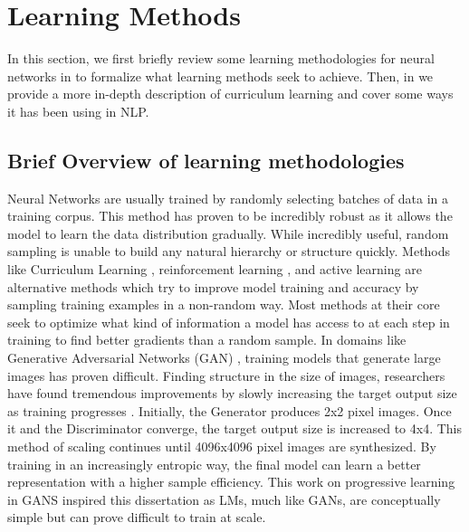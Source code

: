 \section{Learning Methods}
\label{chap:prior:sec:cl}
In this section, we first briefly review some learning methodologies for neural networks in  to formalize what learning methods seek to achieve. Then, in  we provide a more in-depth description of curriculum learning and cover some ways it has been using in NLP. 
\subsection{Brief Overview of learning methodologies}
\label{chap:prior:sec:cl:overview}
Neural Networks are usually trained by randomly selecting batches of data in a training corpus. This method has proven to be incredibly robust as it allows the model to learn the data distribution gradually. While incredibly useful, random sampling is unable to build any natural hierarchy or structure quickly. Methods like Curriculum Learning \cite{Bengio2009CurriculumL}, reinforcement learning \cite{Sutton1998ReinforcementLA}, and active learning \cite{Cohn1994ActiveLW} are alternative methods which try to improve model training and accuracy by sampling training examples in a non-random way. Most methods at their core seek to optimize what kind of information a model has access to at each step in training to find better gradients than a random sample. In domains like Generative Adversarial Networks (GAN) \cite{Goodfellow2014GenerativeAN}, training models that generate large images has proven difficult. Finding structure in the size of images, researchers have found tremendous improvements by slowly increasing the target output size as training progresses \cite{Karras2017ProgressiveGO}. Initially, the Generator produces 2x2 pixel images. Once it and the Discriminator converge, the target output size is increased to 4x4. This method of scaling continues until 4096x4096 pixel images are synthesized. By training in an increasingly entropic way, the final model can learn a better representation with a higher sample efficiency. This work on progressive learning in GANS inspired this dissertation as LMs, much like GANs, are conceptually simple but can prove difficult to train at scale. 
